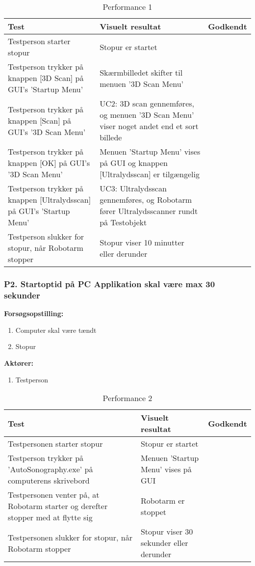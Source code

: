 \begin{table}[htb]
\begin{tabularx}{\textwidth}{|X|X|p{2cm}|}
\hline
\textbf{Test} & \textbf{Visuelt resultat} &\textbf{Godkendt}\\\hline  
Testperson starter stopur & Stopur er startet & \\\hline
Testperson trykker på knappen [3D Scan] på GUI's 'Startup Menu' & Skærmbilledet skifter til menuen '3D Scan Menu' &  \\\hline
Testperson trykker på knappen [Scan] på GUI's '3D Scan Menu' & UC2: 3D scan gennemføres, og menuen '3D Scan Menu' viser noget andet end et sort billede & \\\hline
Testperson trykker på knappen [OK] på GUI's '3D Scan Menu' & Menuen 'Startup Menu' vises på GUI og knappen [Ultralydsscan] er tilgængelig & \\\hline
Testperson trykker på knappen [Ultralydsscan] på GUI's 'Startup Menu' & UC3: Ultralydsscan gennemføres, og Robotarm fører Ultralydsscanner rundt på Testobjekt & \\\hline
Testperson slukker for stopur, når Robotarm stopper & Stopur viser 10 minutter eller derunder & \\\hline
\end{tabularx} 
\caption{Performance 1}
\label{P1}
\end{table}
\newpage

\subsubsection{P2. Startoptid på PC Applikation skal være max 30 sekunder}
\textbf{Forsøgsopstilling:}
\begin{enumerate}
\item Computer skal være tændt
\item Stopur
\end{enumerate}
\textbf{Aktører:}
\begin{enumerate}
\item Testperson
\end{enumerate}

\begin{table}[htb]
\begin{tabularx}{\textwidth}{|X|X|p{2cm}|}
\hline
\textbf{Test} & \textbf{Visuelt resultat} &\textbf{Godkendt}\\\hline  
Testpersonen starter stopur & Stopur er startet & \\ \hline
Testperson trykker på 'AutoSonography.exe' på computerens skrivebord & Menuen 'Startup Menu' vises på GUI &\\\hline
Testpersonen venter på, at Robotarm starter og derefter stopper med at flytte sig & Robotarm er stoppet  & \\\hline
Testpersonen slukker for stopur, når Robotarm stopper & Stopur viser 30 sekunder eller derunder & \\ \hline
\end{tabularx} 
\caption{Performance 2}
\label{P2}
\end{table}
\newpage


